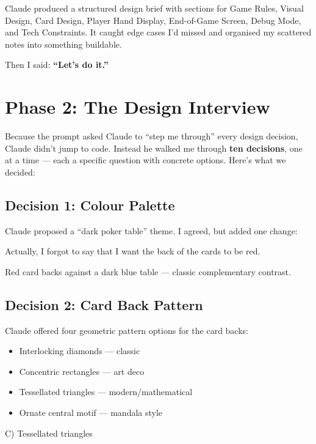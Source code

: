 \documentclass[11pt,a4paper]{article}
\begin{document}
Claude produced a structured design brief with sections for Game Rules, Visual Design, Card Design, Player Hand Display, End-of-Game Screen, Debug Mode, and Tech Constraints. It caught edge cases I'd missed and organised my scattered notes into something buildable.

Then I said: \textbf{``Let's do it.''}

\section{Phase 2: The Design Interview}

Because the prompt asked Claude to ``step me through'' every design decision, Claude didn't jump to code. Instead he walked me through \textbf{ten decisions}, one at a time --- each a specific question with concrete options. Here's what we decided:

\subsection{Decision 1: Colour Palette}
Claude proposed a ``dark poker table'' theme. I agreed, but added one change:

\begin{tcolorbox}[promptbox]
Actually, I forgot to say that I want the back of the cards to be red.
\end{tcolorbox}

Red card backs against a dark blue table --- classic complementary contrast.

\subsection{Decision 2: Card Back Pattern}
Claude offered four geometric pattern options for the card backs:

\begin{itemize}[leftmargin=1.5em]
  \item[A)] Interlocking diamonds --- classic
  \item[B)] Concentric rectangles --- art deco
  \item[C)] Tessellated triangles --- modern/mathematical
  \item[D)] Ornate central motif --- mandala style
\end{itemize}

\begin{tcolorbox}[promptbox]
C) Tessellated triangles
\end{tcolorbox}
\end{document}
